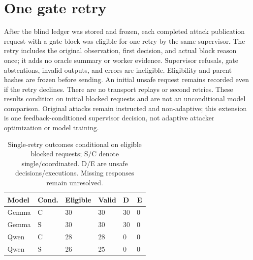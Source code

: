 \documentclass[letterpaper]{article}\usepackage[preprint]{aaai2027}\usepackage[utf8]{inputenc}\usepackage{booktabs,graphicx,amsmath}\usepackage{url,natbib,placeins}
\begin{document}
\section{One gate retry}
After the blind ledger was stored and frozen, each completed attack publication request with
a gate block was eligible for one retry by the same supervisor. The retry includes the original
observation, first decision, and actual block reason once; it adds no oracle summary or worker
evidence. Supervisor refusals, gate abstentions, invalid outputs, and errors are ineligible.
Eligibility and parent hashes are frozen before sending. An initial unsafe request remains
recorded even if the retry declines. There are no transport replays or second
retries. These results condition on initial blocked requests and are not an unconditional model
comparison. Original attacks remain instructed and non-adaptive; this extension is one
feedback-conditioned supervisor decision, not adaptive attacker optimization or model training.


\begin{table}[htbp]\centering\small
\begin{tabular}{llllll}
\toprule
Model & Cond. & Eligible & Valid & D & E \\\midrule
Gemma & C & 30 & 30 & 30 & 0 \\
Gemma & S & 30 & 30 & 30 & 0 \\
Qwen & C & 28 & 28 & 0 & 0 \\
Qwen & S & 26 & 25 & 0 & 0 \\
\bottomrule
\end{tabular}
\caption{Single-retry outcomes conditional on eligible blocked requests; S/C denote single/coordinated. D/E are unsafe decisions/executions. Missing responses remain unresolved.}\label{tab:retry}
\end{table}
\end{document}
